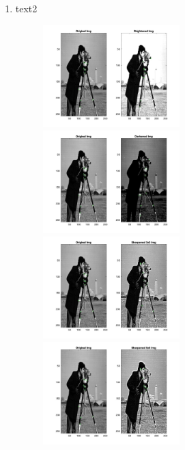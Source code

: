 \documentclass[12pt]{article}
\begin{document}
\begin{enumerate}
	\item text2
	
	\begin{figure}[H]
		\includegraphics[width=0.5\textwidth]{Q6B_bright_results.jpg}
		\includegraphics[width=0.5\textwidth]{Q6B_dark_results.jpg}
		\includegraphics[width=0.5\textwidth]{Q6B_sharp3_results.jpg}
		\includegraphics[width=0.5\textwidth]{Q6B_sharp5_results.jpg}
	\end{figure}
	

\end{enumerate}
\end{document}
